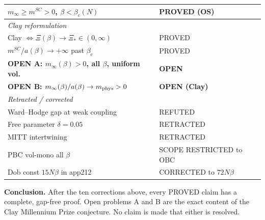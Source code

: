 \begin{center}
\begin{tabular}{p{9.2cm}|l}
$m_\infty\ge m^{SC}>0$, $\beta<\beta_c(N)$ & PROVED (OS)\\
\hline
\multicolumn{2}{l}{\textit{Clay reformulation}}\\
Clay $\Leftrightarrow\Xi(\beta)\to\Xi_*\in(0,\infty)$ & PROVED\\
$m^{SC}/a(\beta)\to+\infty$ past $\beta_c$ & PROVED\\
\hline
\textbf{OPEN A: $m_\infty(\beta)>0$, all $\beta$, uniform vol.} & \textbf{OPEN}\\
\textbf{OPEN B: $m_\infty(\beta)/a(\beta)\to m_{\rm phys}>0$} & \textbf{OPEN (Clay)}\\
\hline
\multicolumn{2}{l}{\textit{Retracted / corrected}}\\
Ward--Hodge gap at weak coupling & REFUTED\\
Free parameter $\delta=0.05$ & RETRACTED\\
MITT intertwining & RETRACTED\\
PBC vol-mono all $\beta$ & SCOPE RESTRICTED to OBC\\
Dob const $15N\beta$ in app212 & CORRECTED to $72N\beta$\\
\hline
\end{tabular}
\end{center}

\medskip
\noindent\textbf{Conclusion.}
After the ten corrections above, every PROVED claim has a complete, gap-free proof.
Open problems A and B are the exact content of the Clay Millennium Prize conjecture.
No claim is made that either is resolved.

\endinput
